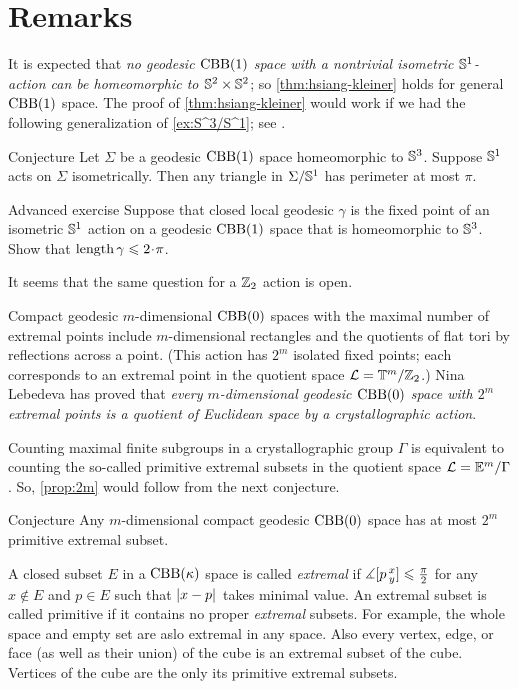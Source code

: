 \section{Remarks}

It is expected that \textit{no geodesic $\mathrm{CBB}(1)$ space with a nontrivial isometric $\mathbb{S}^1$-action can be homeomorphic to $\mathbb{S}^2\times\mathbb{S}^2$};
so \ref{thm:hsiang-kleiner} holds for general $\mathrm{CBB}(1)$ space.
The proof of \ref{thm:hsiang-kleiner} would work if we had the following generalization of \ref{ex:S^3/S^1};
see \cite{harvey-searle}.

\begin{thm}{Conjecture}
Let $\Sigma$ be a geodesic $\mathrm{CBB}(1)$ space homeomorphic to $\mathbb{S}^3$.
Suppose $\mathbb{S}^1$ acts on $\Sigma$ isometrically.
Then any triangle in $\Sigma/\mathbb{S}^1$ has perimeter at most $\pi$.
\end{thm}


\begin{thm}{Advanced exercise}
Suppose that closed local geodesic $\gamma$ is the fixed point of an isometric $\mathbb{S}^1$ action on a geodesic $\mathrm{CBB}(1)$ space that is homeomorphic to $\mathbb{S}^3$.
Show that $\length\gamma\le2\cdot\pi$.
\end{thm}

It seems that the same question for a $\mathbb{Z}_2$ action is open.

Compact geodesic $m$-dimensional $\mathrm{CBB}(0)$ spaces with the maximal number of extremal points include $m$-dimensional rectangles and the quotients of flat tori by reflections across a point.
(This action has $2^m$ isolated fixed points; each corresponds to an extremal point in the quotient space $\mathcal{L}=\mathbb{T}^m/\mathbb{Z}_2$.)
Nina Lebedeva has proved \cite{lebedeva} that \textit{every $m$-dimensional geodesic $\mathrm{CBB}(0)$ space with $2^m$ extremal points is a quotient of Euclidean space by a crystallographic action}.

Counting maximal finite subgroups in a crystallographic group $\Gamma$ is equivalent to counting the so-called primitive extremal subsets in the quotient space $\mathcal{L}=\mathbb{E}^m/\Gamma$.
So, \ref{prop:2m} would follow from the next conjecture.

\begin{thm}{Conjecture}
Any $m$-dimensional compact geodesic $\mathrm{CBB}(0)$ space has at most $2^m$ primitive extremal subset.
\end{thm}

A closed subset $E$ in a $\mathrm{CBB}(\kappa)$ space is called 
\emph{extremal} if $\mangle\hinge pxy\z\le \tfrac\pi2$ for any $x\notin E$ and $p\in E$ such that $\dist{x}{p}{}$ takes minimal value.
An extremal subset is called primitive if it contains no proper \emph{extremal} subsets.
For example, the whole space and empty set are aslo extremal in any space.
Also every vertex, edge, or face (as well as their union) of the cube is an extremal subset of the cube.
Vertices of the cube are the only its primitive extremal subsets.

